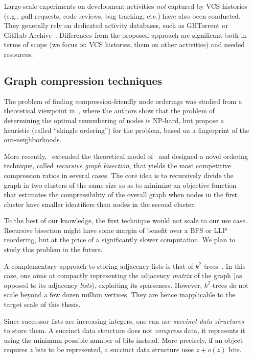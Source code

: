 Large-scale experiments on development activities \emph{not} captured by VCS
histories (e.g., pull requests, code reviews, bug tracking, etc.) have also
been conducted. They generally rely on dedicated activity databases, such as
GHTorrent or GitHub Archive~\cite{GHTorrent, ray2014large}. Differences from
the proposed approach are significant both in terms of scope (we focus on VCS
histories, them on other activities) and needed resources.


\subsection{Graph compression techniques}%
\label{sec:graph-compression-techniques}

The problem of finding compression-friendly node orderings was studied from a
theoretical viewpoint in~\cite{CKLCSN}, where the authors show that the problem
of determining the optimal renumbering of nodes is NP-hard, but propose a
heuristic (called ``shingle ordering'') for the problem, based on a fingerprint
of the out-neighborhoods.

More recently,~\cite{DKKCGIRGB} extended the theoretical model of~\cite{CKLCSN}
and designed a novel ordering technique, called \emph{recursive graph
bisection}, that yields the most competitive compression ratios in several
cases. The core idea is to recursively divide the graph in two clusters of the
same size so as to minimize an objective function that estimates the
compressibility of the overall graph when nodes in the first cluster have
smaller identifiers than nodes in the second cluster.

To the best of our knowledge, the first technique would not scale to our use
case. Recursive bisection might have some margin of benefit over a BFS or LLP
reordering, but at the price of a significantly slower computation. We plan to
study this problem in the future.

A complementary approach to storing adjacency lists is that of
$k^2$-trees~\cite{Brisaboa2014152}. In this case, one aims at compactly
representing the adjacency \emph{matrix} of the graph (as opposed to its
adjacency \emph{lists}), exploiting its sparseness.  However, $k^2$-trees do
not scale beyond a few dozen million vertices. They are hence inapplicable to
the target scale of this thesis.

Since successor lists are increasing integers, one can use \emph{succinct data
  structures}~\cite{NavCDS} to store them. A succinct data structure does not
\emph{compress} data, it represents it using the minimum possible number of
bits instead.
More precisely, if an object requires $z$ bits to be represented, a succinct
data structure uses $z+o(z)$ bits.

